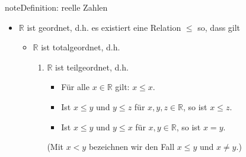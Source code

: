 \documentclass[letterpaper,10pt,english]{jupyterBook}
\begin{document}
\begin{sphinxadmonition}{note}{Definition: reelle Zahlen}
\begin{itemize}
\begin{itemize}
\begin{equation*}
\begin{split}
\begin{split}
    \exists 1: a \cdot 1 = a\quad \forall a \in \mathbb{R}
    \end{split}\end{split}
\end{equation*}
\item {} 
Inverse Elemente
\begin{equation*}
\begin{split}\begin{split}
    \forall a\in \mathbb{R}\ \exists a'\in\mathbb{R} : a + a' = 0\\
    \forall a\in \mathbb{R}\setminus \{ 0\}\ \exists \tilde{a}\in\mathbb{R} : a \cdot \tilde{a} = 1
    \end{split}\end{split}
\end{equation*}
Schreibweise: \(-a := a', a - a := a + (-a), \frac{1}{a} := \tilde{a}, \frac{a}{a} := a\cdot \frac{1}{a}\)

\item {} 
Distributivgesetz
\begin{equation*}
\begin{split}a\cdot (b+c) = a\cdot b + a\cdot c\end{split}
\end{equation*}
\end{itemize}

\item {} 
\(\mathbb{R}\) ist geordnet, d.h. es existiert eine Relation \(\le\) so, dass gilt
\begin{itemize}
\item {} 
\(\mathbb{R}\) ist totalgeordnet, d.h.
\begin{enumerate}
%
\item {} 
\(\mathbb{R}\) ist teilgeordnet, d.h.
\begin{itemize}
\item {} 
Für alle \(x\in\mathbb{R}\) gilt: \(x \le x\).

\item {} 
Ist \(x \le y\) und \(y\le z\) für \(x,y,z\in\mathbb{R}\), so ist \(x \le z\).

\item {} 
Ist \(x \le y\) und \(y \le x\) für \(x,y \in \mathbb{R}\), so ist \(x = y\).

\end{itemize}

(Mit \(x<y\) bezeichnen wir den Fall \(x \le y\) und \(x \not= y\).)


\end{enumerate}
\end{itemize}
\end{itemize}
\end{sphinxadmonition}
\end{document}
